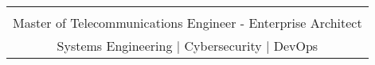\documentclass[a4paper,10pt]{article}
\begin{document}
\vspace{-.00in}

\begin{center}
\begin{tabular}{c}
  \hline \\[-0.8em]
  Master of Telecommunications Engineer - Enterprise Architect \\
  Systems Engineering | Cybersecurity | DevOps

\end{tabular}
\end{center}


\renewcommand{\arraystretch}{0.7}%

\end{document}
